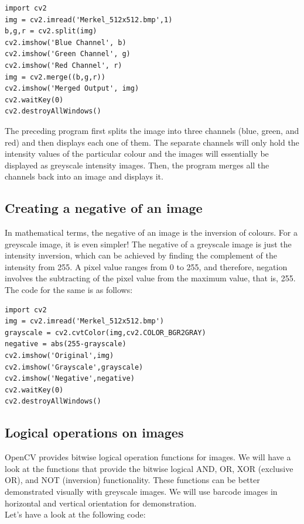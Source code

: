 \documentclass{labo}
\begin{document}
\begin{verbatim}
import cv2
img = cv2.imread('Merkel_512x512.bmp',1)
b,g,r = cv2.split(img)
cv2.imshow('Blue Channel', b)
cv2.imshow('Green Channel', g)
cv2.imshow('Red Channel', r)
img = cv2.merge((b,g,r))
cv2.imshow('Merged Output', img)
cv2.waitKey(0)
cv2.destroyAllWindows()
\end{verbatim}
The preceding program first splits the image into three channels (blue, green, and red) and then displays each one of them. The separate channels will only hold the intensity values of the particular colour and the images will essentially be displayed as greyscale intensity images. Then, the program merges all the channels back into an image and displays it.


\subsection*{Creating a negative of an image}
In mathematical terms, the negative of an image is the inversion of colours. For a greyscale image, it is even simpler! The negative of a greyscale image is just the intensity inversion, which can be achieved by finding the complement of the intensity from 255. A pixel value ranges from 0 to 255, and therefore, negation involves the subtracting of the pixel value from the maximum value, that is, 255. The code for the same is as follows:

\begin{verbatim}
import cv2
img = cv2.imread('Merkel_512x512.bmp')
grayscale = cv2.cvtColor(img,cv2.COLOR_BGR2GRAY)
negative = abs(255-grayscale)
cv2.imshow('Original',img)
cv2.imshow('Grayscale',grayscale)
cv2.imshow('Negative',negative)
cv2.waitKey(0)
cv2.destroyAllWindows()
\end{verbatim}


\subsection*{Logical operations on images}
OpenCV provides bitwise logical operation functions for images. We will have a look at the functions that provide the bitwise logical AND, OR, XOR (exclusive OR), and NOT (inversion) functionality. These functions can be better demonstrated visually with greyscale images. We will use barcode images in horizontal and vertical orientation for demonstration.\\

Let's have a look at the following code:
\end{document}
